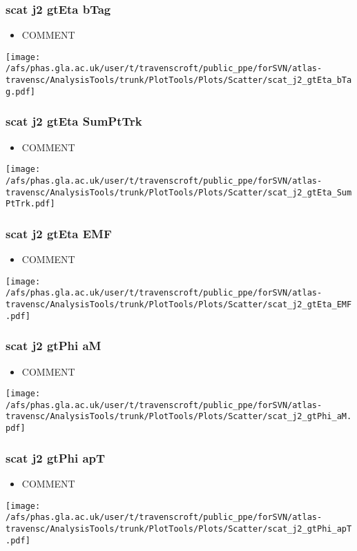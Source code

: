 \documentclass{beamer}
\begin{document}
\begin{frame}
\frametitle{scat j2 gtEta bTag}
\begin{itemize}
\item COMMENT
\end{itemize}
\begin{center}
\texttt{[image: /afs/phas.gla.ac.uk/user/t/travenscroft/public\_ppe/forSVN/atlas-travensc/AnalysisTools/trunk/PlotTools/Plots/Scatter/scat\_j2\_gtEta\_bTag.pdf]}
\end{center}
\end{frame}

\begin{frame}
\frametitle{scat j2 gtEta SumPtTrk}
\begin{itemize}
\item COMMENT
\end{itemize}
\begin{center}
\texttt{[image: /afs/phas.gla.ac.uk/user/t/travenscroft/public\_ppe/forSVN/atlas-travensc/AnalysisTools/trunk/PlotTools/Plots/Scatter/scat\_j2\_gtEta\_SumPtTrk.pdf]}
\end{center}
\end{frame}

\begin{frame}
\frametitle{scat j2 gtEta EMF}
\begin{itemize}
\item COMMENT
\end{itemize}
\begin{center}
\texttt{[image: /afs/phas.gla.ac.uk/user/t/travenscroft/public\_ppe/forSVN/atlas-travensc/AnalysisTools/trunk/PlotTools/Plots/Scatter/scat\_j2\_gtEta\_EMF.pdf]}
\end{center}
\end{frame}

\begin{frame}
\frametitle{scat j2 gtPhi aM}
\begin{itemize}
\item COMMENT
\end{itemize}
\begin{center}
\texttt{[image: /afs/phas.gla.ac.uk/user/t/travenscroft/public\_ppe/forSVN/atlas-travensc/AnalysisTools/trunk/PlotTools/Plots/Scatter/scat\_j2\_gtPhi\_aM.pdf]}
\end{center}
\end{frame}

\begin{frame}
\frametitle{scat j2 gtPhi apT}
\begin{itemize}
\item COMMENT
\end{itemize}
\begin{center}
\texttt{[image: /afs/phas.gla.ac.uk/user/t/travenscroft/public\_ppe/forSVN/atlas-travensc/AnalysisTools/trunk/PlotTools/Plots/Scatter/scat\_j2\_gtPhi\_apT.pdf]}
\end{center}
\end{frame}
\end{document}
